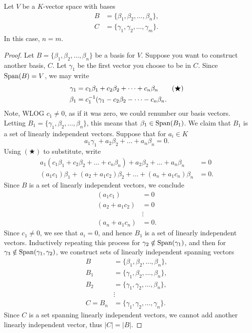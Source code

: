 \documentclass{ximera}
\begin{document}
\begin{theorem}
  Let $V$ be a $K$-vector space with bases
  \begin{align*}
    B &= \{\beta_1,\beta_2,\dots, \beta_n\}, \\
    C &= \{\gamma_1,\gamma_2, \dots, \gamma_m\}.
  \end{align*}
  In this case, $n = m$.
  \begin{proof}
    Let $B= \{\beta_1,\beta_2,\dots, \beta_n\}$ be a basis for $V$.
    Suppose you want to construct another basis, $C$.  Let $\gamma_1$
    be the first vector you choose to be in $C$. Since $\operatorname{Span}(B) = V$,
    we may write
    \begin{align}
      \gamma_1 &= c_1\beta_1 + c_2\beta_2 + \dots + c_n\beta_n \tag{$\bigstar$}\\
      \beta_1 &= c_1^{-1}(\gamma_1 -  c_2\beta_2 - \dots - c_n\beta_n.\notag
    \end{align}
    Note, WLOG $c_1 \ne 0$, as if it was zero, we could renumber our
    basis vectors.  Letting $B_1 = \{\gamma_1, \beta_2,\dots,
    \beta_n\}$, this means that $\beta_1\in \operatorname{Span}(B_1)$. We claim that
    $B_1$ is a set of linearly independent vectors. Suppose that for
    $a_i\in K$
    \[
    a_1 \gamma_1 + a_2 \beta_2 + \dots + a_n \beta_n = 0.
    \]
    Using $(\bigstar)$ to substitute, write
    \begin{align*}
      a_1(c_1\beta_1 + c_2\beta_2 + \dots + c_n\beta_n) + a_2 \beta_2 + \dots + a_n \beta_n &= 0\\
      (a_1c_1) \beta_1 + (a_2+a_1c_2)\beta_2 + \dots + (a_n+a_1c_n)\beta_n &= 0.
    \end{align*}
    Since $B$ is a set of linearly independent vectors, we conclude
    \begin{align*}
      (a_1c_1) &=0\\
      (a_2+a_1c_2) &=0\\
      &\vdots \\      
      (a_n+a_1c_n) &=0.
    \end{align*}
    Since $c_1\ne 0$, we see that $a_i = 0$, and hence $B_1$ is a set
    of linearly independent vectors. Inductively repeating this
    process for $\gamma_2\notin \operatorname{Span}(\gamma_1)$, and then for
    $\gamma_3 \notin \operatorname{Span}(\gamma_1,\gamma_2)$, we construct sets of
    linearly independent spanning vectors
    \begin{align*}
      B &= \{\beta_1,\beta_2,\dots,\beta_n\},\\
      B_1 &= \{\gamma_1,\beta_2,\dots,\beta_n\},\\
      B_2 &= \{\gamma_1,\gamma_2,\dots,\beta_n\},\\
      &\vdots \\
      C = B_n &= \{\gamma_1,\gamma_2,\dots,\gamma_n\}.
    \end{align*}
    Since $C$ is a set spanning linearly independent vectors, we
    cannot add another linearly independent vector, thus $|C| = |B|$.
  \end{proof}
\end{theorem}
\end{document}

